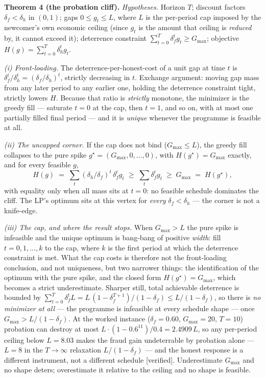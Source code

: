 \documentclass[11pt,a4paper]{article}
\begin{document}
\begin{thebox}
\textbf{Theorem 4 (the probation cliff).} \emph{Hypotheses.} Horizon $T$; discount factors $\delta_f<\delta_h$ in $(0,1)$; gaps
$0\le g_t\le L$, where $L$ is the per-period cap imposed by the newcomer's own economic ceiling (since $g_t$ is the amount that
ceiling is \emph{reduced} by, it cannot exceed it); deterrence constraint $\sum_{t=0}^T\delta_f^t g_t\ge G_{\max}$; objective
$H(g)=\sum_{t=0}^T\delta_h^t g_t$.

\emph{(i) Front-loading.} The deterrence-per-honest-cost of a unit gap at time $t$ is $\delta_f^t/\delta_h^t=(\delta_f/\delta_h)^t$,
strictly decreasing in $t$. Exchange argument: moving gap mass from any later period to any earlier one, holding the deterrence
constraint tight, strictly lowers $H$. Because that ratio is \emph{strictly} monotone, the minimizer is the greedy fill --- saturate
$t=0$ at the cap, then $t=1$, and so on, with at most one partially filled final period --- and it is \emph{unique} whenever the
programme is feasible at all.

\emph{(ii) The uncapped corner.} If the cap does not bind ($G_{\max}\le L$), the greedy fill collapses to the pure spike
$g^\star=(G_{\max},0,\dots,0)$, with $H(g^\star)=G_{\max}$ exactly, and for every feasible $g$,
\[
H(g)\;=\;\sum_t(\delta_h/\delta_f)^t\,\delta_f^t g_t\;\ge\;\sum_t\delta_f^t g_t\;\ge\;G_{\max}\;=\;H(g^\star),
\]
with equality only when all mass sits at $t=0$: no feasible schedule dominates the cliff. The LP's optimum sits at this vertex for
\emph{every} $\delta_f<\delta_h$ --- the corner is not a knife-edge.

\emph{(iii) The cap, and where the result stops.} When $G_{\max}>L$ the pure spike is infeasible and the unique optimum is
bang-bang of positive \emph{width}: fill $t=0,1,\dots,k$ to the cap, where $k$ is the first period at which the deterrence
constraint is met. What the cap costs is therefore not the front-loading conclusion, and not uniqueness, but two narrower things:
the identification of the optimum with the pure spike, and the closed form $H(g^\star)=G_{\max}$, which becomes a strict
underestimate. Sharper still, total achievable deterrence is bounded by $\sum_{t=0}^T\delta_f^tL = L\,(1-\delta_f^{T+1})/(1-\delta_f)
\le L/(1-\delta_f)$, so there is \emph{no minimizer at all} --- the programme is infeasible at every schedule shape --- once
$G_{\max}>L/(1-\delta_f)$. At the worked instance ($\delta_f=0.60$, $G_{\max}=20$, $T=10$) probation can destroy at most
$L\cdot(1-0.6^{11})/0.4=2.4909\,L$, so any per-period ceiling below $L=8.03$ makes the fraud gain undeterrable by probation alone
--- $L=8$ in the $T\to\infty$ relaxation $L/(1-\delta_f)$ --- and the honest response is a different instrument, not a different
schedule [verified]. Underestimate $G_{\max}$ and no shape deters; overestimate it relative to the ceiling and no shape is
feasible.


\end{thebox}
\end{document}
